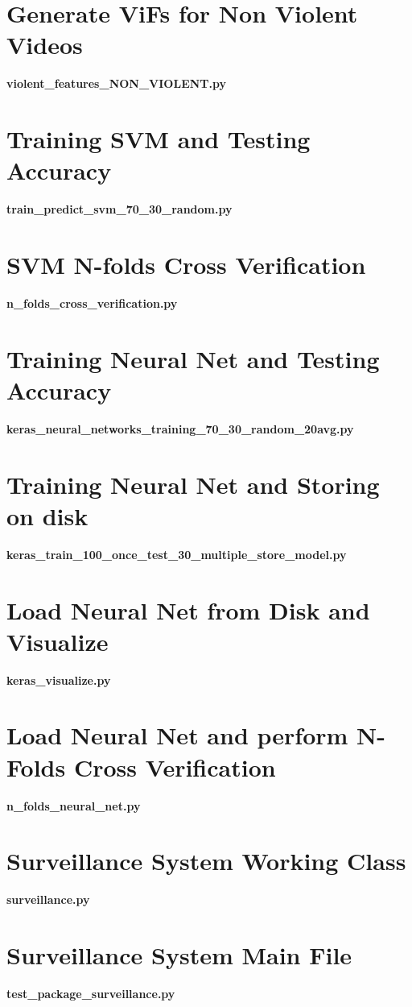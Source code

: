 \begin{appendices}
\section{Generate ViFs for Non Violent Videos}
\textbf{violent\_features\_NON\_VIOLENT.py}

\section{Training SVM and Testing Accuracy}
\textbf{train\_predict\_svm\_70\_30\_random.py}

\section{SVM N-folds Cross Verification}
\textbf{n\_folds\_cross\_verification.py}

\section{Training Neural Net and Testing Accuracy}
\textbf{keras\_neural\_networks\_training\_70\_30\_random\_20avg.py}

\section{Training Neural Net and Storing on disk}
\textbf{keras\_train\_100\_once\_test\_30\_multiple\_store\_model.py}

\section{Load Neural Net from Disk and Visualize}
\textbf{keras\_visualize.py}

\section{Load Neural Net and perform N-Folds Cross Verification}
\textbf{n\_folds\_neural\_net.py}

\section{Surveillance System Working Class}
\textbf{surveillance.py}

\section{Surveillance System Main File}
\textbf{test\_package\_surveillance.py}

\end{appendices}